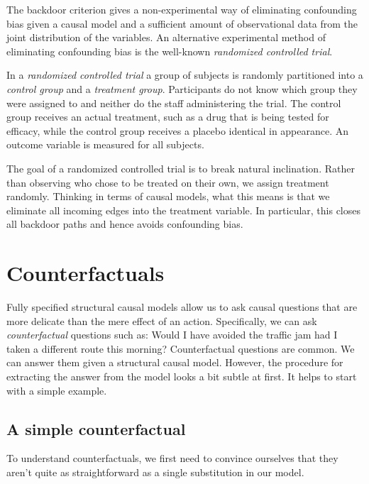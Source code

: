 \documentclass{tufte-book}
\begin{document}
The backdoor criterion gives a non-experimental way of eliminating
confounding bias given a causal model and a sufficient amount of
observational data from the joint distribution of the variables. An
alternative experimental method of eliminating confounding bias is the
well-known \emph{randomized controlled trial}.

In a \emph{randomized controlled
trial} a group of subjects is
randomly partitioned into a \emph{control group} and a \emph{treatment
group}. Participants do not know which group they were assigned to and
neither do the staff administering the trial. The control group receives
an actual treatment, such as a drug that is being tested for efficacy,
while the control group receives a placebo identical in appearance. An
outcome variable is measured for all
subjects.

The goal of a randomized controlled trial is to break natural
inclination. Rather than observing who chose to be treated on their own,
we assign treatment randomly. Thinking in terms of causal models, what
this means is that we eliminate all incoming edges into the treatment
variable. In particular, this closes all backdoor paths and hence avoids
confounding bias.

\hypertarget{counterfactuals}{%
\section{Counterfactuals}\label{counterfactuals}}

Fully specified structural causal models allow us to ask causal
questions that are more delicate than the mere effect of an action.
Specifically, we can ask \emph{counterfactual}
questions such as: Would I have avoided the traffic jam had I taken a
different route this morning? Counterfactual questions are common. We
can answer them given a structural causal model. However, the procedure
for extracting the answer from the model looks a bit subtle at first. It
helps to start with a simple example.

\hypertarget{a-simple-counterfactual}{%
\subsection{A simple counterfactual}\label{a-simple-counterfactual}}

To understand counterfactuals, we first need to convince ourselves that
they aren't quite as straightforward as a single substitution in our
model.
\end{document}

